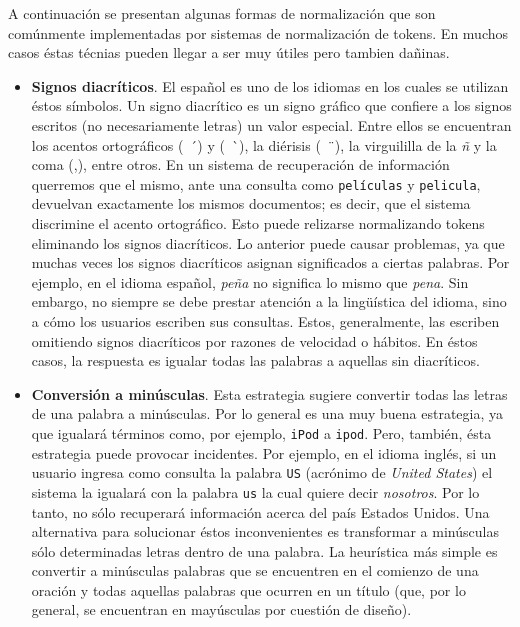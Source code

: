 		A continuación se presentan algunas formas de normalización que son comúnmente implementadas por sistemas de normalización de tokens. En muchos casos éstas técnias pueden llegar a ser muy útiles pero tambien dañinas.
		\begin{itemize}
			\item \textbf{Signos diacríticos}. El español es uno de los idiomas en los cuales se utilizan éstos símbolos. Un signo diacrítico es un signo gráfico que confiere a los signos escritos (no necesariamente letras) un valor especial. Entre ellos se encuentran los acentos ortográficos (\ \' \ ) y (\ \` \ ), la diérisis (\ \" \ ), la virguililla de la \textit{ñ} y la coma (,), entre otros. En un sistema de recuperación de información querremos que el mismo, ante una consulta como \texttt{películas} y \texttt{pelicula}, devuelvan exactamente los mismos documentos; es decir, que el sistema discrimine el acento ortográfico. Esto puede relizarse normalizando tokens eliminando los signos diacríticos. Lo anterior puede causar problemas, ya que muchas veces los signos diacríticos asignan significados a ciertas palabras. Por ejemplo, en el idioma español, \textit{peña} no significa lo mismo que \textit{pena}. Sin embargo, no siempre se debe prestar atención a la lingüística del idioma, sino a cómo los usuarios escriben sus consultas. Estos, generalmente, las escriben omitiendo signos diacríticos por razones de velocidad o hábitos. En éstos casos, la respuesta es igualar todas las palabras a aquellas sin diacríticos.
			\item \textbf{Conversión a minúsculas}. Esta estrategia sugiere convertir todas las letras de una palabra a minúsculas. Por lo general es una muy buena estrategia, ya que igualará  términos como, por ejemplo, \texttt{iPod} a \texttt{ipod}. Pero, también, ésta estrategia puede provocar incidentes. Por ejemplo, en el idioma inglés, si un usuario ingresa como consulta la palabra \texttt{US} (acrónimo de \textit{United States}) el sistema la igualará con la palabra \texttt{us} la cual quiere decir \textit{nosotros}. Por lo tanto, no sólo recuperará información acerca del país Estados Unidos. Una alternativa para solucionar éstos inconvenientes es transformar a minúsculas sólo determinadas letras dentro de una palabra. La heurística más simple es convertir a minúsculas palabras que se encuentren en el comienzo de una oración y todas aquellas palabras que ocurren en un título (que, por lo general, se encuentran en mayúsculas por cuestión de diseño). 
		\end{itemize}
		
